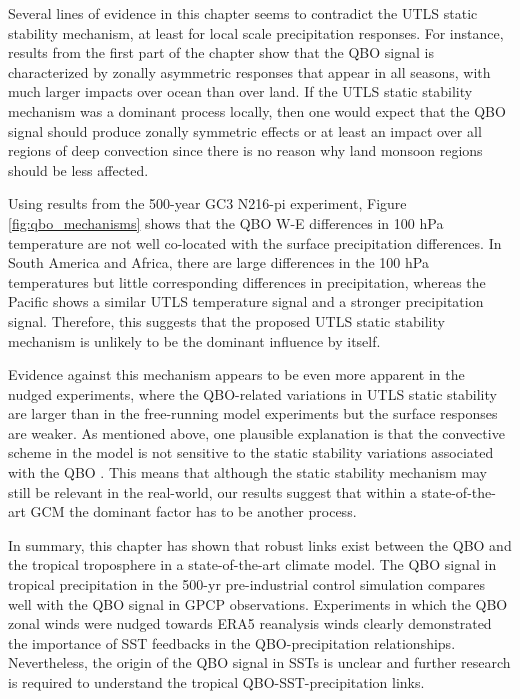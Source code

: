  Several lines of evidence in this chapter seems to contradict the UTLS static stability mechanism, at least for local scale precipitation responses. For instance, results from the first part of the chapter show that the QBO signal is characterized by zonally asymmetric responses that appear in all seasons, with much larger impacts over ocean than over land.  If the UTLS static stability mechanism was a dominant process locally, then one would expect that the QBO signal should produce zonally symmetric effects or at least an impact over all regions of deep convection since there is no reason why land monsoon regions 
should be less affected. 

Using results from the 500-year GC3 N216-pi  experiment, Figure \ref{fig:qbo_mechanisms} shows that the QBO W-E differences in 100 hPa temperature are not well co-located with the surface precipitation differences. In South America and Africa, there are large differences in the 100 hPa temperatures but little corresponding differences in precipitation, whereas the Pacific shows a similar UTLS temperature signal and a stronger precipitation signal. Therefore, this suggests that  the proposed UTLS static stability mechanism is unlikely to be the dominant influence by itself.  

Evidence against this mechanism appears to be even more apparent in the nudged experiments, where the QBO-related variations in UTLS static stability are larger than in the free-running model experiments but the surface responses are weaker.
As mentioned above, one plausible explanation is that the convective scheme in the model is not sensitive to the static stability variations associated with the QBO \citep{yamazaki2020tropospheric}. This means that although the static stability mechanism may still be relevant in the real-world, our results suggest that within a state-of-the-art GCM the dominant factor has to be another process.


In summary, this chapter has shown that robust links exist between the QBO and the 
tropical troposphere in a state-of-the-art climate model. The QBO signal in tropical precipitation in the 500-yr pre-industrial control simulation compares well with the QBO signal in GPCP observations. Experiments in which the QBO zonal winds were nudged towards ERA5 reanalysis winds clearly demonstrated the importance of SST feedbacks in the QBO-precipitation relationships. Nevertheless, the origin of the QBO signal in SSTs is unclear and  further research is required to understand the tropical QBO-SST-precipitation links. %

